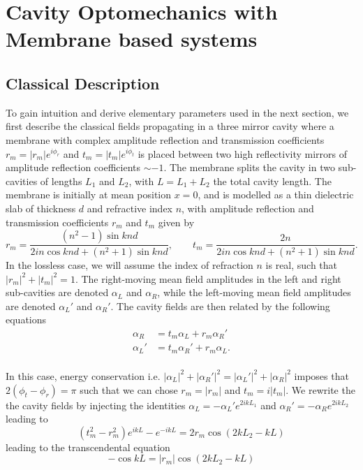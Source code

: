 \section{Cavity Optomechanics with Membrane based systems }
\subsection{Classical Description}
To gain intuition and derive elementary parameters used in the next section, we first describe the classical fields propagating in a three mirror cavity where a membrane with complex amplitude reflection and transmission coefficients \(r_m=|r_m|e^{i\phi_r}\) and \(t_m=|t_m|e^{i\phi_t}\) is placed between two high reflectivity mirrors of amplitude reflection coefficients \( \sim -1 \). The membrane splits the cavity in two sub-cavities of lengths \(L_1\) and \(L_2\), with \(L=L_1+L_2\) the total cavity length. The membrane is initially at mean position $x=0$, and is modelled as a thin dielectric slab of thickness \(d\) and refractive index \(n\), with amplitude reflection and transmission coefficients \(r_m\) and \(t_m\) given by \cite{thompson_strong_2008}
\begin{equation}
r_m = \frac{(n^2-1)\sin k n d}{2 i n \cos k n d  + (n^2+1)\sin k n d}, \qquad t_m = \frac{2 n}{2 i n \cos k n d  + (n^2+1)\sin k n d}. 
\end{equation}
In the lossless case, we will assume the index of refraction $n$ is real, such that \(|r_m|^2 + |t_m|^2 = 1\). The right-moving mean field amplitudes in the left and right sub-cavities are denoted \(\alpha_L\) and \(\alpha_R\), while the left-moving mean field amplitudes are denoted \(\alpha_L'\) and \(\alpha_R'\). The cavity fields are then related by the following equations
\begin{equation}
\begin{split}
\alpha_R  &= t_m \alpha_L + r_m \alpha_R' \\
\alpha_L' &= t_m \alpha_R'+ r_m \alpha_L. \\
\end{split}
\end{equation}

In this case, energy conservation i.e. $|\alpha_L|^2 + |\alpha_R'|^2 = |\alpha_L'|^2 + |\alpha_R|^2$ imposes that $2(\phi_t-\phi_r) = \pi$ such that we can chose $r_m = |r_m|$ and $t_m = i|t_m|$. We rewrite the the cavity fields by injecting the identities $\alpha_L = - \alpha_L' e^{2ikL_1}$ and $\alpha_R' = - \alpha_R e^{2ikL_2}$ leading to
\begin{equation}
   (t_m^2 - r_m^2) e^{ikL} - e^{-ikL}  = 2 r_m \cos(2kL_2 - kL )
\end{equation}
leading to the transcendental equation \cite{jayich_dispersive_2008}
\begin{equation}
  -\cos kL = |r_m|\cos (2kL_2 - kL)
\end{equation}

